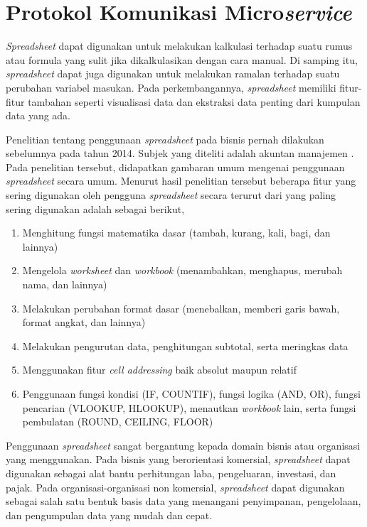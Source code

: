 \section{Protokol Komunikasi Micro\textit{service}}
\textit{Spreadsheet} dapat digunakan untuk melakukan kalkulasi terhadap suatu rumus atau formula yang sulit jika dikalkulasikan dengan cara manual. Di samping itu, \textit{spreadsheet} dapat juga digunakan untuk melakukan ramalan terhadap suatu perubahan variabel masukan. Pada perkembangannya, \textit{spreadsheet} memiliki fitur-fitur tambahan seperti visualisasi data dan ekstraksi data penting dari kumpulan data yang ada.

Penelitian tentang penggunaan \textit{spreadsheet} pada bisnis pernah dilakukan sebelumnya pada tahun 2014. Subjek yang diteliti adalah akuntan manajemen \citep{Bradbard2014}. Pada penelitian tersebut, didapatkan gambaran umum mengenai penggunaan \textit{spreadsheet} secara umum. Menurut hasil penelitian tersebut beberapa fitur yang sering digunakan oleh pengguna \textit{spreadsheet} secara terurut dari yang paling sering digunakan adalah sebagai berikut,

\begin{enumerate}
    \item Menghitung fungsi matematika dasar (tambah, kurang, kali, bagi, dan lainnya)
    \item Mengelola \textit{worksheet} dan \textit{workbook} (menambahkan, menghapus, merubah nama, dan lainnya)
    \item Melakukan perubahan format dasar (menebalkan, memberi garis bawah, format angkat, dan lainnya)
    \item Melakukan pengurutan data, penghitungan subtotal, serta meringkas data
    \item Menggunakan fitur \textit{cell addressing} baik absolut maupun relatif
    \item Penggunaan fungsi kondisi (IF, COUNTIF), fungsi logika (AND, OR), fungsi pencarian (VLOOKUP, HLOOKUP), menautkan \textit{workbook} lain, serta fungsi pembulatan (ROUND, CEILING, FLOOR)
\end{enumerate}

Penggunaan \textit{spreadsheet} sangat bergantung kepada domain bisnis atau organisasi yang menggunakan. Pada bisnis yang berorientasi komersial, \textit{spreadsheet} dapat digunakan sebagai alat bantu perhitungan laba, pengeluaran, investasi, dan pajak. Pada organisasi-organisasi non komersial, \textit{spreadsheet} dapat digunakan sebagai salah satu bentuk basis data yang menangani penyimpanan, pengelolaan, dan pengumpulan data yang mudah dan cepat.

